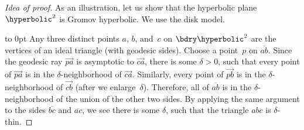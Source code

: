 \begin{proof}[Idea of proof] As an illustration, let us show that the hyperbolic plane~$\hyperbolic^2$ is Gromov hyperbolic. We use the disk model.

\baselineskip %

\vbox{%
\vbox to 0pt{\baselineskip{}\vss}%
\hangindent=-1.85in  
Any three distinct points $a$, $b$, and~$c$ on $\bdry\hyperbolic^2$ are the vertices of an ideal triangle (with geodesic sides).
%
%
%
%
%
%
%
%
%
%
Choose a point~$p$ on $\overline{ab}$.
Since the geodesic ray $\overrightarrow{pa}$ is asymptotic to $\overrightarrow{ca}$, there is some $\delta > 0$, such that every point of $\overrightarrow{pa}$ is in the $\delta$-neighborhood of $\overrightarrow{ca}$. Similarly, every point of $\overrightarrow{pb}$ is in the $\delta$-neighborhood of $\overrightarrow{cb}$ (after we enlarge~$\delta$). Therefore, all of $\overline{ab}$ is in the $\delta$-neighborhood of the union of the other two sides. By applying the same argument to the sides $\overline{bc}$ and $\overline{ac}$, we see there is some $\delta$, such that the triangle $abc$ is $\delta$-thin.
}


\end{proof}

